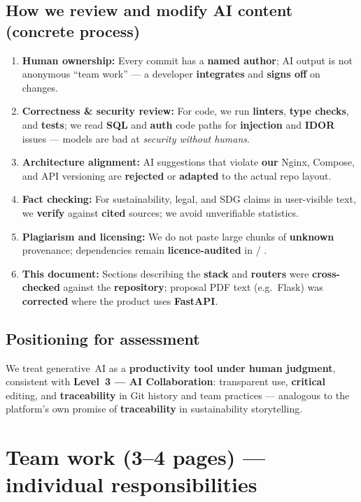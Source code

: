 \documentclass[11pt,a4paper]{article}
\begin{document}
\subsection{How we review and modify AI content (concrete process)}
\begin{enumerate}[leftmargin=1.4em]
  \item \textbf{Human ownership:} Every commit has a \textbf{named author}; AI output is not anonymous ``team work'' --- a developer \textbf{integrates} and \textbf{signs off} on changes.
  \item \textbf{Correctness \& security review:} For code, we run \textbf{linters}, \textbf{type checks}, and \textbf{tests}; we read \textbf{SQL} and \textbf{auth} code paths for \textbf{injection} and \textbf{IDOR} issues --- models are bad at \emph{security without humans}.
  \item \textbf{Architecture alignment:} AI suggestions that violate \textbf{our} Nginx, Compose, and API versioning are \textbf{rejected} or \textbf{adapted} to the actual repo layout.
  \item \textbf{Fact checking:} For sustainability, legal, and SDG claims in user-visible text, we \textbf{verify} against \textbf{cited} sources; we avoid unverifiable statistics.
  \item \textbf{Plagiarism and licensing:} We do not paste large chunks of \textbf{unknown} provenance; dependencies remain \textbf{licence-audited} in  / .
  \item \textbf{This document:} Sections describing the \textbf{stack} and \textbf{routers} were \textbf{cross-checked} against the \textbf{repository}; proposal PDF text (e.g.\ Flask) was \textbf{corrected} where the product uses \textbf{FastAPI}.
\end{enumerate}

\subsection{Positioning for assessment}
We treat generative~AI as a \textbf{productivity tool under human judgment}, consistent with \textbf{Level~3 --- AI Collaboration}: transparent use, \textbf{critical} editing, and \textbf{traceability} in Git history and team practices --- analogous to the platform's own promise of \textbf{traceability} in sustainability storytelling.

\section{Team work (3--4 pages) --- individual responsibilities}
\end{document}
